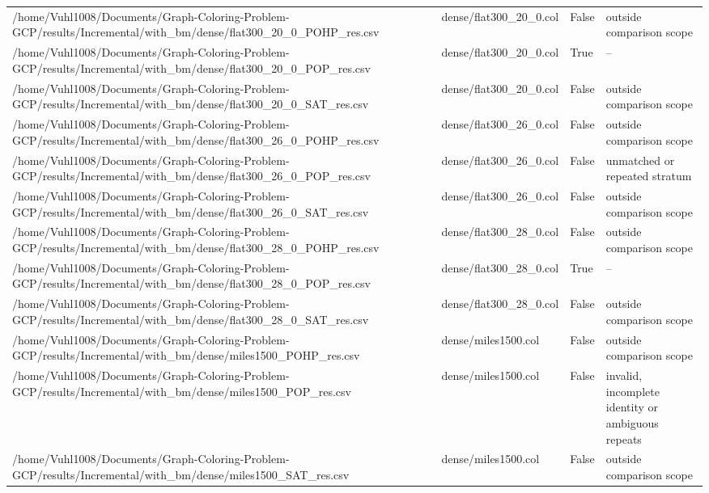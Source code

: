 \begin{table}[htbp]
\begin{tabular}{llll}
/home/Vuhl1008/Documents/Graph-Coloring-Problem-GCP/results/Incremental/with\_bm/dense/flat300\_20\_0\_POHP\_res.csv & dense/flat300\_20\_0.col & False & outside comparison scope \\
/home/Vuhl1008/Documents/Graph-Coloring-Problem-GCP/results/Incremental/with\_bm/dense/flat300\_20\_0\_POP\_res.csv & dense/flat300\_20\_0.col & True & -- \\
/home/Vuhl1008/Documents/Graph-Coloring-Problem-GCP/results/Incremental/with\_bm/dense/flat300\_20\_0\_SAT\_res.csv & dense/flat300\_20\_0.col & False & outside comparison scope \\
/home/Vuhl1008/Documents/Graph-Coloring-Problem-GCP/results/Incremental/with\_bm/dense/flat300\_26\_0\_POHP\_res.csv & dense/flat300\_26\_0.col & False & outside comparison scope \\
/home/Vuhl1008/Documents/Graph-Coloring-Problem-GCP/results/Incremental/with\_bm/dense/flat300\_26\_0\_POP\_res.csv & dense/flat300\_26\_0.col & False & unmatched or repeated stratum \\
/home/Vuhl1008/Documents/Graph-Coloring-Problem-GCP/results/Incremental/with\_bm/dense/flat300\_26\_0\_SAT\_res.csv & dense/flat300\_26\_0.col & False & outside comparison scope \\
/home/Vuhl1008/Documents/Graph-Coloring-Problem-GCP/results/Incremental/with\_bm/dense/flat300\_28\_0\_POHP\_res.csv & dense/flat300\_28\_0.col & False & outside comparison scope \\
/home/Vuhl1008/Documents/Graph-Coloring-Problem-GCP/results/Incremental/with\_bm/dense/flat300\_28\_0\_POP\_res.csv & dense/flat300\_28\_0.col & True & -- \\
/home/Vuhl1008/Documents/Graph-Coloring-Problem-GCP/results/Incremental/with\_bm/dense/flat300\_28\_0\_SAT\_res.csv & dense/flat300\_28\_0.col & False & outside comparison scope \\
/home/Vuhl1008/Documents/Graph-Coloring-Problem-GCP/results/Incremental/with\_bm/dense/miles1500\_POHP\_res.csv & dense/miles1500.col & False & outside comparison scope \\
/home/Vuhl1008/Documents/Graph-Coloring-Problem-GCP/results/Incremental/with\_bm/dense/miles1500\_POP\_res.csv & dense/miles1500.col & False & invalid, incomplete identity or ambiguous repeats \\
/home/Vuhl1008/Documents/Graph-Coloring-Problem-GCP/results/Incremental/with\_bm/dense/miles1500\_SAT\_res.csv & dense/miles1500.col & False & outside comparison scope \\

\end{tabular}
\end{table}
